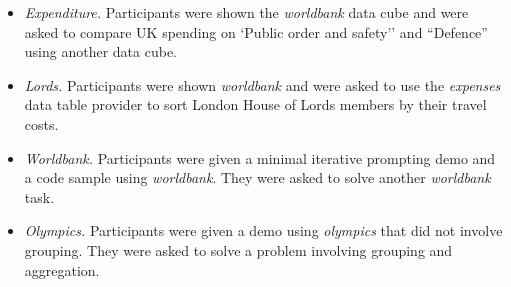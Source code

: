 \documentclass[conference]{IEEEtran}
\begin{document}
\vspace{0.5em}
\begin{itemize}
\setlength\itemsep{0.5em}
\item \emph{Expenditure.} Participants were shown the \emph{worldbank} data cube
  and were asked to compare UK spending on `Public order and safety'' and ``Defence''
  using another data cube.
\item \emph{Lords.} Participants were shown \emph{worldbank} and were asked to use the
  \emph{expenses} data table provider to sort London House of Lords members by their
  travel costs.
\item \emph{Worldbank.} Participants were given a minimal iterative prompting demo and
  a code sample using \emph{worldbank}. They were asked to solve another \emph{worldbank} task.
\item \emph{Olympics.} Participants were given a demo using \emph{olympics} that did not involve grouping.
  They were asked to solve a problem involving grouping and aggregation.
\end{itemize}
\vspace{0.5em}

%
%

%
%
\end{document}
